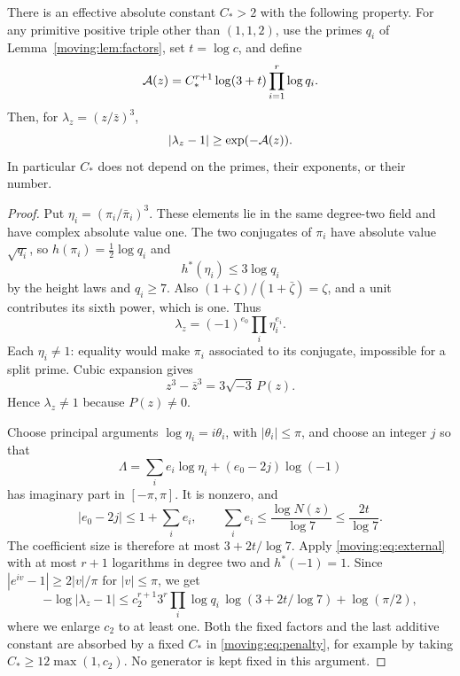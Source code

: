 \begin{theorem}\label{moving:thm:angle}
There is an effective absolute constant $C_*>2$ with the following property. For any primitive positive triple other than $(1,1,2)$, use the primes $q_i$ of Lemma~\ref{moving:lem:factors}, set $t=\log c$, and define
\begin{equation}\label{moving:eq:penalty}
 \mathcal A(z)=C_*^{r+1}\log(3+t)\prod_{i=1}^r\log q_i.
\end{equation}
Then, for $\lambda_z=(z/\bar z)^3$,
\begin{equation}\label{moving:eq:angbound}
 |\lambda_z-1|\ge\exp(-\mathcal A(z)).
\end{equation}
In particular $C_*$ does not depend on the primes, their exponents, or their number.
\end{theorem}
\begin{proof}
Put $\eta_i=(\pi_i/\bar\pi_i)^3$. These elements lie in the same degree-two field and have complex absolute value one. The two conjugates of $\pi_i$ have absolute value $\sqrt{q_i}$, so $h(\pi_i)=\frac12\log q_i$ and
\[
 h^*(\eta_i)\le3\log q_i
\]
by the height laws and $q_i\ge7$. Also $(1+\zeta)/(1+\bar\zeta)=\zeta$, and a unit contributes its sixth power, which is one. Thus
\[
 \lambda_z=(-1)^{e_0}\prod_i\eta_i^{e_i}.
\]
Each $\eta_i\ne1$: equality would make $\pi_i$ associated to its conjugate, impossible for a split prime. Cubic expansion gives
\begin{equation}\label{moving:eq:cubic}
 z^3-\bar z^3=3\sqrt{-3}\,P(z).
\end{equation}
Hence $\lambda_z\ne1$ because $P(z)\ne0$.

Choose principal arguments $\log\eta_i=i\theta_i$, with $|\theta_i|\le\pi$, and choose an integer $j$ so that
\[
 \Lambda=\sum_i e_i\log\eta_i+(e_0-2j)\log(-1)
\]
has imaginary part in $[-\pi,\pi]$. It is nonzero, and
\[
 |e_0-2j|\le1+\sum_i e_i,
 \qquad \sum_i e_i\le\frac{\log N(z)}{\log7}\le\frac{2t}{\log7}.
\]
The coefficient size is therefore at most $3+2t/\log7$. Apply \eqref{moving:eq:external} with at most $r+1$ logarithms in degree two and $h^*(-1)=1$. Since $|e^{iv}-1|\ge2|v|/\pi$ for $|v|\le\pi$, we get
\[
 -\log|\lambda_z-1|
 \le c_2^{r+1}3^r\prod_i\log q_i\,
       \log(3+2t/\log7)+\log(\pi/2),
\]
where we enlarge $c_2$ to at least one. Both the fixed factors and the last additive constant are absorbed by a fixed $C_*$ in \eqref{moving:eq:penalty}, for example by taking $C_*\ge12\max(1,c_2)$. No generator is kept fixed in this argument.
\end{proof}

